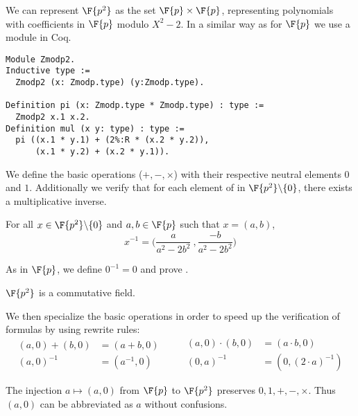 We can represent $\F{p^2}$ as the set $\F{p} \times \F{p}$,
representing polynomials with coefficients in $\F{p}$ modulo $X^2 - 2$. In a similar way
as for $\F{p}$ we use a module in Coq.
\begin{lstlisting}[language=Coq,belowskip=-0.25 \baselineskip]
Module Zmodp2.
Inductive type :=
  Zmodp2 (x: Zmodp.type) (y:Zmodp.type).

Definition pi (x: Zmodp.type * Zmodp.type) : type :=
  Zmodp2 x.1 x.2.
Definition mul (x y: type) : type :=
  pi ((x.1 * y.1) + (2%:R * (x.2 * y.2)),
      (x.1 * y.2) + (x.2 * y.1)).
\end{lstlisting}

We define the basic operations ($+, -, \times$) with their respective neutral
elements $0$ and $1$. Additionally we verify that for each element of in
$\F{p^2}\backslash\{0\}$, there exists a multiplicative inverse.
\begin{lemma}
  \label{lemma:Zmodp2_inv}
  For all $x \in \F{p^2}\backslash\{0\}$ and $a,b \in \F{p}$ such that $x = (a,b)$,
  $$x^{-1} = \Big(\frac{a}{a^2-2b^2}\ , \frac{-b}{a^2-2b^2}\Big)$$
\end{lemma}
As in $\F{p}$, we define $0^{-1} = 0$ and prove .
\begin{lemma}
  \label{lemma:Zmodp2_field}
  $\F{p^2}$ is a commutative field.
\end{lemma}

We then specialize the basic operations in order to speed up the verification
of formulas by using rewrite rules:
\begin{equation*}
  \begin{split}
    (a,0) + (b,0) &= (a+b, 0)\\
    (a, 0)^{-1} &= (a^{-1}, 0)
  \end{split}
  \qquad
  \begin{split}
    (a,0) \cdot   (b,0) &= (a \cdot b, 0)\\
    (0,a)^{-1} &= (0,(2\cdot a)^{-1})
  \end{split}
\end{equation*}

The injection $a \mapsto (a,0)$ from $\F{p}$ to $\F{p^2}$ preserves
$0, 1, +, -, \times$. Thus $(a,0)$ can be abbreviated as $a$ without confusions.

